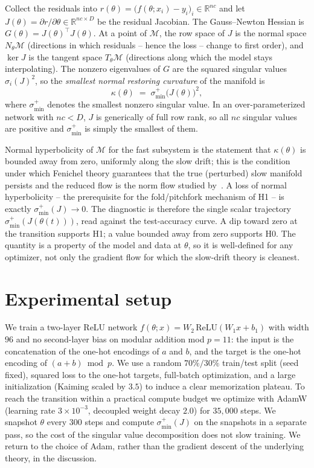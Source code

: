 \documentclass[11pt]{article}
\newcommand{\sminp}{\sigma_{\min}^{+}}
\newcommand{\R}{\mathbb{R}}
\begin{document}
Collect the residuals into $r(\theta)=\big(f(\theta;x_i)-y_i\big)_i\in\R^{nc}$
and let $J(\theta)=\partial r/\partial\theta\in\R^{nc\times D}$ be the residual
Jacobian. The Gauss--Newton Hessian is $G(\theta)=J(\theta)^\top J(\theta)$. At
a point of $\mathcal{M}$, the row space of $J$ is the normal space
$N_\theta\mathcal{M}$ (directions in which residuals -- hence the loss --
change to first order), and $\ker J$ is the tangent space $T_\theta\mathcal{M}$
(directions along which the model stays interpolating). The nonzero
eigenvalues of $G$ are the squared singular values $\sigma_i(J)^2$, so the
\emph{smallest normal restoring curvature} of the manifold is
\begin{equation}
  \kappa(\theta) \;=\; \sminp\!\big(J(\theta)\big)^2 ,
\end{equation}
where $\sminp$ denotes the smallest nonzero singular value. In an
over-parameterized network with $nc<D$, $J$ is generically of full row rank, so
all $nc$ singular values are positive and $\sminp$ is simply the smallest of
them.

Normal hyperbolicity of $\mathcal{M}$ for the fast subsystem is the statement
that $\kappa(\theta)$ is bounded away from zero, uniformly along the slow
drift; this is the condition under which Fenichel theory guarantees that the
true (perturbed) slow manifold persists and the reduced flow is the norm flow
studied by~\cite{musat2025,boursier2025}. A loss of normal hyperbolicity --
the prerequisite for the fold/pitchfork mechanism of H1 -- is exactly
$\sminp(J)\to 0$. The diagnostic is therefore the single scalar trajectory
$\sminp(J(\theta(t)))$, read against the test-accuracy curve. A dip toward zero
at the transition supports H1; a value bounded away from zero supports H0. The
quantity is a property of the model and data at $\theta$, so it is well-defined
for any optimizer, not only the gradient flow for which the slow-drift theory
is cleanest.

\section{Experimental setup}
We train a two-layer ReLU network $f(\theta;x)=W_2\,\mathrm{ReLU}(W_1 x + b_1)$
with width $96$ and no second-layer bias on modular addition mod $p=11$: the
input is the concatenation of the one-hot encodings of $a$ and $b$, and the
target is the one-hot encoding of $(a+b)\bmod p$. We use a random
$70\%/30\%$ train/test split (seed fixed), squared loss to the one-hot targets,
full-batch optimization, and a large initialization (Kaiming scaled by $3.5$)
to induce a clear memorization plateau. To reach the transition within a
practical compute budget we optimize with AdamW (learning rate $3\times10^{-3}$,
decoupled weight decay $2.0$) for $35{,}000$ steps. We snapshot $\theta$ every
$300$ steps and compute $\sminp(J)$ on the snapshots in a separate pass, so the
cost of the singular value decomposition does not slow training. We return to
the choice of Adam, rather than the gradient descent of the underlying theory,
in the discussion.
\end{document}
